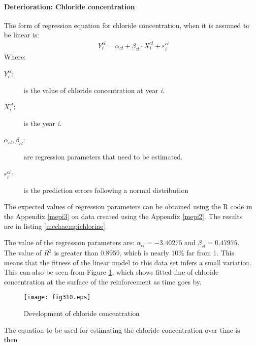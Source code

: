 \paragraph{Deterioration: Chloride concentration} \label{chrloride}
The form of regression equation for chloride concentration, when it is assumed to be linear is:
\begin{eqnarray}
 && Y_i^{cl} = {\alpha _{cl}} + {\beta _{cl}} \cdot X_i^{cl} + \varepsilon _i^{cl} \label{eq3224}
\end{eqnarray}
Where:
\begin{adjustwidth}{1cm}{}
\begin{description}
\item[$Y_i^{cl}$:] is the value of chloride concentration at year \textit{i}.
\item[$X_i^{cl}$:] is the year \textit{i}.
\item[${\alpha _{cl}},{\beta _{cl}}$:] are regression parameters that need to be estimated.
\item[$\varepsilon _i^{cl}$:] is the prediction errors following a normal distribution
\end{description}
\end{adjustwidth}
The expected values of regression parameters can be obtained using the R code in the Appendix \ref{mepi3} on data created using the Appendix \ref{mepi2}. The results are in listing \ref{mechaempichlorine}.



The value of the regression parameters are: ${\alpha _{cl}} =  - 3.40275$ and ${\beta _{cl}} = 0.47975$. The value of ${R^2}$ is greater than 0.8959, which is nearly 10\% far from 1. This means that the fitness of the linear model to this data set infers a small variation. This can also be seen from Figure \ref{fig:310}, which shows fitted line of chloride concentration at the surface of the reinforcement as time goes by.
\begin{figure}[h]
\texttt{[image: fig310.eps]}
\caption{Development of chloride concentration}\label{fig:310}
\end{figure}
The equation to be used for estimating the chloride concentration over time is then

